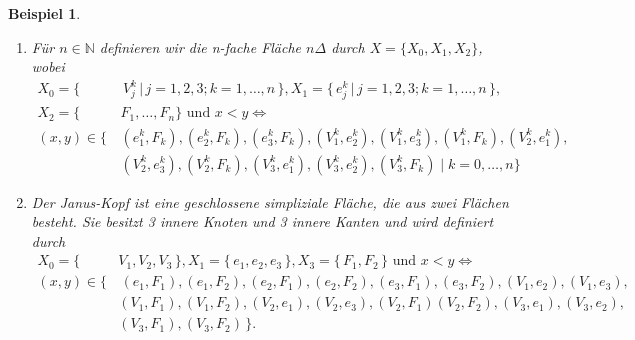 \documentclass[12pt,titlepage,twoside,cleardoublepage]{article}
\theoremstyle{nummermitklammern}
\newtheorem{bsp}[temp]{Beispiel}
\newtheorem{bsp}[zahl]{Beispiel}
\numberwithin{equation}{section}
\begin{document}
\begin{bsp}
\begin{enumerate}
 \item
 Für $n \in \mathbb{N}$ definieren wir die \emph{n-fache Fläche} $n \Delta$ durch $X=\{X_{0},X_{1},X_{2}\}$, wobei
 \begin{align*}
  X_{0}=\{& \,V_{j}^{k}\,\vert\, j=1,2,3 ;k=1,\ldots,n\,\}, X_{1}=\{\,e_{j}^{k}\,\vert\, j=1,2,3 ;k=1,\ldots,n\,\},\\
   X_{2}=\{&F_{1},\ldots,F_{n}\} \text{ und } x<y \Leftrightarrow \\
 (x,y)\in \{\,&(e_{1}^k,F_{k}),(e_{2}^k,F_{k}),(e_{3}^k,F_{k}),(V_{1}^k,e_{2}^k),(V_{1}^k,e_{3}^k),(V_{1}^k,F_{k}), (V_{2}^k,e_{1}^k),\\ &(V_{2}^k,e_{3}^k),(V_{2}^k,F_{k}),(V_{3}^k,e_{1}^k),(V_{3}^k,e_{2}^k),(V_{3}^k,F_{k})\mid k=0,\ldots,n\} 
\end{align*}
 
 \item 
 Der \emph{Janus-Kopf} ist eine geschlossene simpliziale Fläche, die aus zwei Flächen besteht.	Sie besitzt 3 innere Knoten und  3 innere Kanten und wird definiert durch
 \begin{align*}
 X_{0}=\{\,&V_{1},V_{2},V_{3}\,\} ,X_{1}=\{\,e_{1},e_{2},e_{3}\,\},X_{3}=\{\, F_{1},F_{2}\,\}  \text{ und } x<y \Leftrightarrow \\
 (x,y)\in\{&\,(e_{1},F_{1}),(e_{1},F_{2}),(e_{2},F_{1}),(e_{2},F_{2}),(e_{3},F_{1}),(e_{3},F_{2}),(V_{1},e_{2}),(V_{1},e_{3}),\\ &(V_{1},F_{1}),
  (V_{1},F_{2}),(V_{2},e_{1}),(V_{2},e_{3}),(V_{2},F_{1})
 (V_{2},F_{2}), (V_{3},e_{1}), (V_{3},e_{2}),\\&(V_{3},F_{1}),(V_{3},F_{2}) \,\}.
 \end{align*}

 \begin{figure}[H]
\begin{tikzpicture}[line cap=round,line join=round,>=triangle 45,x=1.0cm,y=1.0cm]


\end{tikzpicture}
\end{figure}
\end{enumerate}
\end{bsp}
\end{document}
